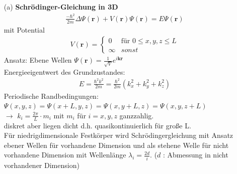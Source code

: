 \begin{itemize}
    \item [(a)] \textbf{Schrödinger-Gleichung in 3D} \\
        \begin{align}
            \frac{-\hbar^2}{2m} \Delta \Psi(\textbf{r}) + V(\textbf{r}) \Psi(\textbf{r}) = E \Psi(\textbf{r})
        \end{align}
        mit Potential
        \begin{align*}
            V(\textbf{r}) = \begin{cases}
                0 & \text{für } 0 \le x,y,z \le L\\
                \infty & sonst
            \end{cases}
        \end{align*}
        Ansatz: Ebene Wellen $ \Psi(\textbf{r}) = \frac{1}{\sqrt{V}} e^{i\textbf{kr}}$  \\
        Energieeigentwert des Grundzustandes:
        \begin{align}
            E = \frac{\hbar^2k^2}{2m} = \frac{\hbar^2}{2m}(k_x^2 + k_y^2 + k_z^2)
        \end{align}
        Periodische Randbedingungen:\\ $\Psi(x,y,z) = \Psi(x+L,y,z) = \Psi(x,y+L,z) = \Psi(x,y,z+L)$ \\
        $\rightarrow$ $k_i = \frac{2\pi}{L} \cdot m_i $ mit $m_i$ für $i =x,y,z$ ganzzahlig. \\
        diskret aber \glqq liegen dicht \grqq d.h. quasikontinuierlich für große L. \\
        Für niedrigdimensionale Festkörper wird Schrödingergleichung mit Ansatz ebener Wellen für \glqq vorhandene Dimension \grqq und als stehene Welle für \glqq nicht vorhandene \grqq Dimension mit Wellenlänge $ \lambda_i = \frac{2d}{i} $. ($d$ : Abmessung in nicht vorhandener Dimension) \\
        

\end{itemize}
